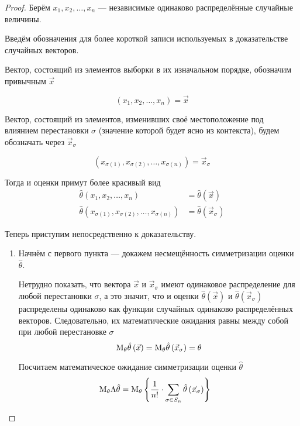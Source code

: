 \begin{proof}
    Берём $x_1, x_2, \dots, x_n$ --- независимые одинаково распределённые
    случайные величины.

    Введём обозначения для более короткой записи
    используемых в доказательстве случайных векторов.

    Вектор, состоящий из элементов выборки в их изначальном порядке,
    обозначим привычным $\vec{x}$

    $$\left(x_1, x_2, \dots, x_n\right)=\vec{x}$$

    Вектор, состоящий из элементов, изменивших своё местоположение под влиянием
    перестановки $\sigma$ (значение которой будет ясно из контекста),
    будем обозначать через $\vec{x}_\sigma$

    $$\left(x_{\sigma\left(1\right)}, x_{\sigma\left(2\right)},
        \dots, x_{\sigma\left(n\right)}\right)=\vec{x}_\sigma$$

    Тогда и оценки примут более красивый вид
    \begin{align*}
        \hat{\theta}\left(x_1, x_2, \dots, x_n\right)
            &= \hat{\theta}\left(\vec{x}\right)\\
        \hat{\theta}\left(x_{\sigma\left(1\right)},
                x_{\sigma\left(2\right)},
                \dots, x_{\sigma\left(n\right)}\right)
            &= \hat{\theta}\left(\vec{x}_\sigma\right)
    \end{align*}

    Теперь приступим непосредственно к доказательству.
    \begin{enumerate}
        \item
            Начнём с первого пункта --- докажем несмещённость
            симметризации оценки $\hat{\theta}$.

            Нетрудно показать, что  вектора $\vec{x}$ и $\vec{x}_\sigma$
            имеют одинаковое распределение для любой перестановки $\sigma$,
            а это значит, что и оценки $\hat{\theta}\left(\vec{x}\right)$
            и $\hat{\theta}\left(\vec{x}_\sigma\right)$
            распределены одинаково как функции случайных
            одинаково распределённых векторов.
            Следовательно, их математические ожидания равны между собой
            при любой перестановке $\sigma$
            $$\mathrm{M}_{\theta} \hat{\theta}\left(\vec{x}\right)
                =\mathrm{M}_{\theta} \hat{\theta}\left(\vec{x}_\sigma\right)
                =\theta$$

            Посчитаем математическое ожидание симметризации оценки
            $\hat{\theta}$
            \begin{align*}
                \mathrm{M}_{\theta} \Lambda\hat{\theta}
                    &=\mathrm{M}_{\theta} 
                        \left\{\frac{1}{n!}\cdot\sum_{\sigma\in S_n}
                        \hat{\theta}\left(\vec{x}_\sigma\right)\right\}
            \end{align*}


\end{enumerate}
\end{proof}
